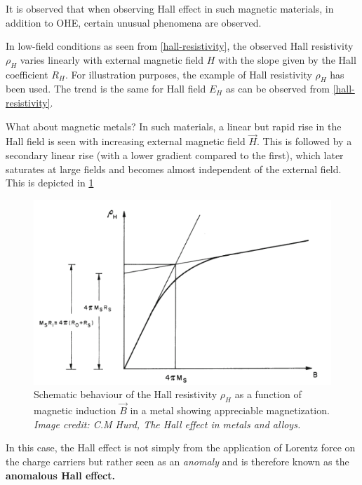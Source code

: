 It is observed that when observing Hall effect in such magnetic materials, in addition to OHE, certain unusual phenomena are observed.

In low-field conditions as seen from \cref{hall-resistivity}, the observed Hall resistivity $ \rho_H $ varies linearly with external magnetic field $ H $ with the slope given by the Hall coefficient $ R_H $.
For illustration purposes, the example of Hall resistivity $ \rho_H $ has been used.
The trend is the same for Hall field $ E_H $ as can be observed from \cref{hall-resistivity}.

What about magnetic metals?
In such materials, a linear but rapid rise in the Hall field is seen with increasing external magnetic field $ \vec{H} $.
This is followed by a secondary linear rise (with a lower gradient compared to the first), which later saturates at large fields and becomes almost independent of the external field.
This is depicted in \cref{fig:hall-rho-linear}

\begin{figure}[h!]
    \includegraphics[width=\columnwidth]{hall-rho-hurd.png}
    \caption{Schematic behaviour of the Hall resistivity $ \rho_H $ as a function of magnetic induction $ \vec{B} $ in a metal showing appreciable magnetization.\\ \vspace{0.2cm} \textit{Image credit: C.M Hurd, The Hall effect in metals and alloys.} }
    \label{fig:hall-rho-linear}
\end{figure}

In this case, the Hall effect is not simply from the application of Lorentz force on the charge carriers but rather seen as an \textit{anomaly} and is therefore known as the \textbf{anomalous Hall effect.}


